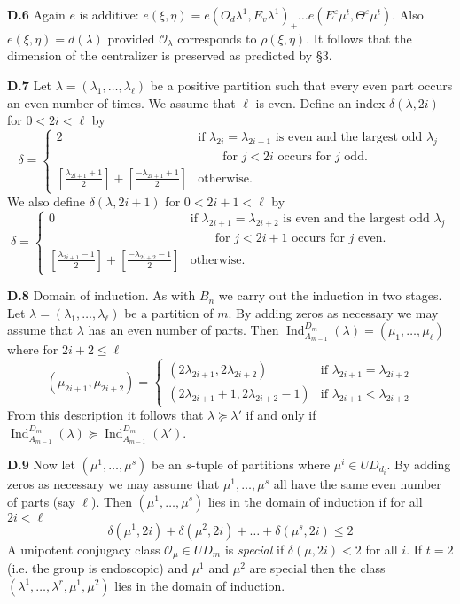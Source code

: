 \documentclass{amsart}
\newcommand\Am		{A_{m-1}}
\newcommand\eps	{\varepsilon}
\newcommand\Ind	{\operatorname{Ind}}
\newcommand\lam	{\lambda}
\newcommand\lams	{(\lam_1,\dots,\lam_\ell)}
\newcommand\mus	{(\mu_1,\dots,\mu_\ell)}
\newcommand\cO		{{\mathcal O}}
\newcommand\rhoxi	{\rho(\xi,\eta)}
\begin{document}
\noindent
{\bf D.6} \qquad Again $e$ is additive:  
$e(\xi,\eta) = e(O_d\lam^1,E_v \lam^1)_+ \dots 
	e(E^\eps \mu^t,\Theta^\eps \mu^t)$. Also
$e(\xi,\eta) = d(\lam)$ provided $\cO_\lam$ corresponds to $\rhoxi$. 
It follows that the dimension of the centralizer is preserved as predicted
by \S 3.

\noindent
{\bf D.7} \qquad Let $\lam = \lams$ be a positive partition such that every
even part occurs an even number of times.  We assume that $\ell$ is even.
Define an index $\delta(\lam,2i)$ for $0 < 2i < \ell$ by
	$$
\delta = \begin{cases} 2 &\text{if $\lam_{2i} = \lam_{2i+1}$ 
is even and the largest odd $\lam_j$} \\
&\qquad \text{for $j<2i$ occurs for $j$ odd.} \\
\left[ \textstyle{\frac{\lam_{2i+1} + 1}{2}} \right] + 
\left[ \textstyle{\frac{-\lam_{2i+1} + 1}{2}} \right] &\text{otherwise.}
\end{cases}
	$$
We also define $\delta(\lam,2i+1)$ for $0 < 2i+1 < \ell$ by
		$$
\delta = \begin{cases} 0 &\text{if $\lam_{2i+1} = \lam_{2i+2}$ 
is even and the largest odd $\lam_j$} \\
&\qquad \text{for $j<2i+1$ occurs for $j$ even.} \\
\left[ \textstyle{\frac{\lam_{2i+1} - 1}{2}} \right] + 
\left[ \textstyle{\frac{-\lam_{2i+2} - 1}{2}} \right] &\text{otherwise.}
\end{cases}
	$$

\noindent
{\bf D.8} \qquad Domain of induction.  As with $B_n$ we carry out the 
induction in two stages.  Let $\lam = \lams$ be a partition of $m$.  By
adding zeros as necessary we may assume that $\lam$ has an even number of
parts.  Then $\Ind_{{\Am}}^{D_m} (\lam) = \mus$ where for $2i + 2 \le \ell$
	$$
(\mu_{2i+1},\mu_{2i+2}) = \begin{cases} 
(2\lam_{2i+1}, 2\lam_{2i+2}) &\text{if $\lam_{2i+1} = \lam_{2i+2}$} \\
(2\lam_{2i+1} + 1, 2\lam_{2i+2} - 1) &\text{if $\lam_{2i+1} < \lam_{2i+2}$}
\end{cases}
	$$
From this description it follows that $\lam \succeq \lam'$ if and only if 
$\Ind_{{\Am}}^{D_m} (\lam) \succeq \Ind_{{\Am}}^{D_m} (\lam')$.
	
\noindent
{\bf D.9} \qquad Now let $(\mu^1 ,\dots, \mu^s)$ be an $s$-tuple of 
partitions where $\mu^i \in UD_{d_i}$.  By adding
zeros as necessary we may assume that $\mu^1 ,\dots, \mu^s$ all have the
same even number of parts (say $\ell$).  Then $(\mu^1 ,\dots, \mu^s)$ lies 
in the domain of induction if for all $2i < \ell$
	$$
	\delta(\mu^1,2i) + \delta(\mu^2,2i) +\dots+ \delta(\mu^s,2i) \le 2
	$$
A unipotent conjugacy class $\cO_\mu \in UD_m$ is {\it special\/} if
$\delta(\mu,2i) < 2$ for all $i$. If $t=2$ (i.e. the group is endoscopic) 
and $\mu^1$ and $\mu^2$ are special then the class 
$(\lam^1 ,\dots, \lam^r,\mu^1,\mu^2)$ lies in the domain of induction.  
\end{document}
